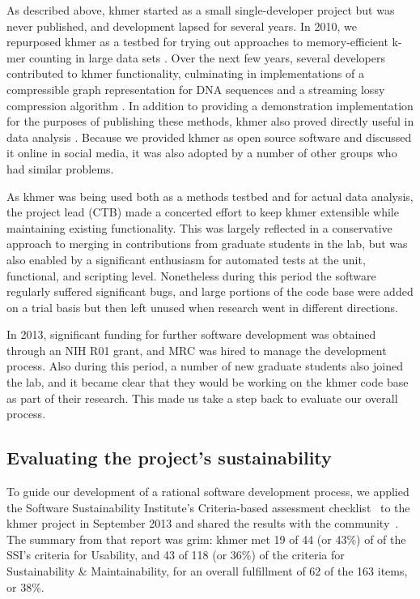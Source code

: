 \documentclass[12pt]{article}
\begin{document}
As described above, khmer started as a small single-developer project
but was never published, and development lapsed for several years.  In
2010, we repurposed khmer as a testbed for trying out approaches to
memory-efficient k-mer counting in large data sets \cite{Zhang2014}.
Over the next few years, several developers contributed to khmer
functionality, culminating in implementations of a compressible
graph representation for DNA sequences and a streaming lossy compression
algorithm \cite{Pell2012} \cite{diginorm}.  In addition to providing a
demonstration implementation for the purposes of publishing these methods,
khmer also proved directly useful in data analysis \cite{Howe14032014}. Because
we provided khmer as open source software and discussed it online in
social media, it was also adopted by a number of other groups who had
similar problems.

As khmer was being used both as a methods testbed and for actual
data analysis, the project lead (CTB) made a concerted effort to keep
khmer extensible while maintaining existing functionality.  This was
largely reflected in a conservative approach to merging in
contributions from graduate students in the lab, but was also enabled
by a significant enthusiasm for automated tests at the unit,
functional, and scripting level.  Nonetheless during this period the
software regularly suffered significant bugs, and large portions of
the code base were added on a trial basis but then left unused when
research went in different directions.

In 2013, significant funding for further software development was
obtained through an NIH R01 grant, and MRC was hired to manage the
development process. Also during this period, a number of new graduate
students also joined the lab, and it became clear that they would
be working on the khmer code base as part of their research.
This made us take a step back to evaluate our overall process.

\subsection{Evaluating the project's sustainability}

To guide our development of a rational software development process,
we applied the Software Sustainability Institute's Criteria-based
assessment checklist~\cite{SSI-eval-guide} to the khmer project in
September 2013 and shared the results with the
community~\cite{khmer-assessment}. The summary from that report was grim: khmer
met 19 of 44 (or 43\%) of of the SSI's criteria for Usability, and 43
of 118 (or 36\%) of the criteria for Sustainability \& Maintainability, for an 
overall fulfillment of 62 of the 163 items, or 38\%.
\end{document}
